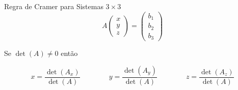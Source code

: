 \documentclass[fleqn,aspectratio=169,12pt]{beamer}
\begin{document}
\begin{frame}{Regra de Cramer para Sistemas $3 \times 3$}
  \[
    A
    \begin{pmatrix}
      x \\
      y \\
      z
    \end{pmatrix}
    =
    \begin{pmatrix}
      b_1 \\
      b_2 \\
      b_3
    \end{pmatrix}
  \]

  \pause
  Se
  \(
  \det(A)\neq0
  \)
  então

  \pause
  \[
    x = \frac{\det(A_x)}{\det(A)}
    \qquad\qquad
    y = \frac{\det(A_y)}{\det(A)}
    \qquad\qquad
    z = \frac{\det(A_z)}{\det(A)}
  \]
\end{frame}






%
%

\end{document}
